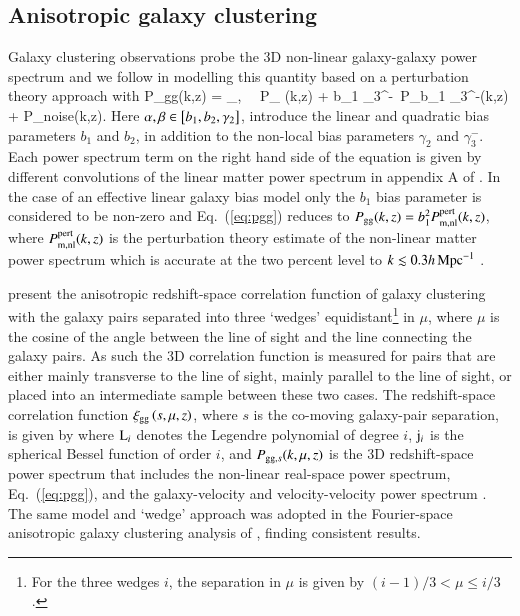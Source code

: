 \subsection{Anisotropic galaxy clustering}
\label{sec:clustering}
Galaxy clustering observations probe the 3D non-linear galaxy-galaxy power spectrum and we follow \citet{sanchez/etal:2017} in modelling this quantity based on a perturbation theory approach with
\be
\label{eq:pgg}
P_{\rm gg}(k,z) = \sum_{\alpha,\beta} \alpha\, \beta\, P_{\alpha
  \beta}(k,z) + b_1 \gamma_3^-\, P_{b_1 \gamma_3^-}(k,z) + P_{\rm noise}(k,z)\;.
\ee
Here $\alpha,\beta \in \left[ b_1, b_2, \gamma_2 \right]$, introduce the linear and quadratic bias parameters $b_1$ and $b_2$, in addition to the non-local bias parameters $ \gamma_2$ and $\gamma_3^-$.  Each power spectrum term on the right hand side of the equation is given by different convolutions of the linear matter power spectrum in appendix A of \citet{sanchez/etal:2017}.   In the case of an effective linear galaxy bias model \citep[see for example][]{vanuitert/etal:2018, abbott/etal:2018} only the $b_1$ bias parameter is considered to be non-zero and Eq.~(\ref{eq:pgg}) reduces to $P_{\rm gg}(k,z) =b_1^2 P_{\rm m, nl}^{\rm pert}(k,z)$, where $P_{\rm m, nl}^{\rm pert}(k,z)$ is the perturbation theory estimate of the non-linear matter power spectrum which is accurate at the two percent level to $k \lesssim 0.3 h \,{\rm Mpc}^{-1}$ \citep{sanchez/etal:2017}. 

\citet{sanchez/etal:2017} present the anisotropic redshift-space correlation function of galaxy clustering with the galaxy pairs separated into three `wedges' equidistant\footnote{For the three wedges $i$, the separation in $\mu$ is given by $(i-1)/3 < \mu \leq i/3$.} in $\mu$, where $\mu$ is the cosine of the angle between the line of sight and the line connecting the galaxy pairs.   As such the 3D correlation function is measured for pairs that are either mainly transverse to the line of sight, mainly parallel to the line of sight, or placed into an intermediate sample between these two cases.  The redshift-space correlation function $\xi_{\rm gg} \left( s,\mu,z \right)$, where $s$ is the co-moving galaxy-pair separation, is given by
where ${\rm L}_i$ denotes the Legendre polynomial of degree $i$, ${\rm j}_i$ is the spherical Bessel function of order $i$, and $P_{{\rm gg}, s}(k,\mu,z)$ is the 3D redshift-space power spectrum that includes the non-linear real-space power spectrum, Eq.~(\ref{eq:pgg}), and the galaxy-velocity and velocity-velocity power spectrum \citep[see][for details, including how the Alcock-Paczynski distortions are accounted for in the modelling]{sanchez/etal:2017}.     The same model and `wedge' approach was adopted in the Fourier-space anisotropic galaxy clustering analysis of \citet{grieb/etal:2017}, finding consistent results.

